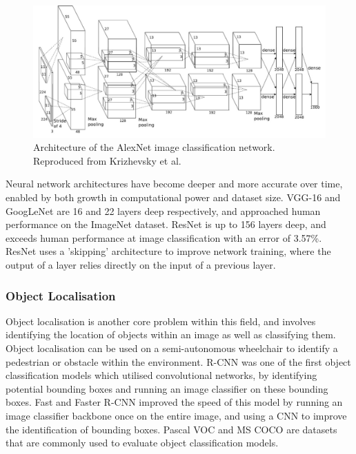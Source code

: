 \begin{figure}[b]
    \centering
    \includegraphics[width=0.8\linewidth]{images/alexnet_architecture.png}
    \caption{Architecture of the AlexNet image classification network. Reproduced from Krizhevsky et al. \cite{krizhevskyImageNetClassificationDeep2012}}
    \label{fig:alexnet_architecture}
\end{figure}

Neural network architectures have become deeper and more accurate over time, enabled by both
growth in computational power and dataset size. VGG-16 \cite{simonyanVeryDeepConvolutional2014}
and GoogLeNet \cite{szegedyGoingDeeperConvolutions2014}
are 16 and 22 layers deep respectively, and approached
human performance on the ImageNet dataset. ResNet \cite{heDeepResidualLearning2016} is up to 156 layers deep,
and exceeds human performance at image classification with an error of 3.57\%.
ResNet uses a 'skipping' architecture to improve network training, where the output of a layer relies directly on
the input of a previous layer.

\subsubsection{Object Localisation}
Object localisation is another core problem within this field, and involves identifying the location of objects within an image as well as classifying them.
Object localisation can be used on a semi-autonomous wheelchair to identify
a pedestrian or obstacle within the environment. R-CNN \cite{girshickRichFeatureHierarchies2013} was one of the
first object classification models which utilised convolutional networks, by identifying potential bounding boxes
and running an image classifier on these bounding boxes. Fast and Faster R-CNN \cite{girshickFastRCNN2015}\cite{renFasterRCNNRealTime2015}
improved the speed of this model by running an image classifier backbone once on the entire image, and using a CNN to improve
the identification of bounding boxes. Pascal VOC \cite{everinghamPascalVisualObject2009} and MS COCO \cite{linMicrosoftCOCOCommon2014}
are datasets that are commonly used to evaluate object classification models.

